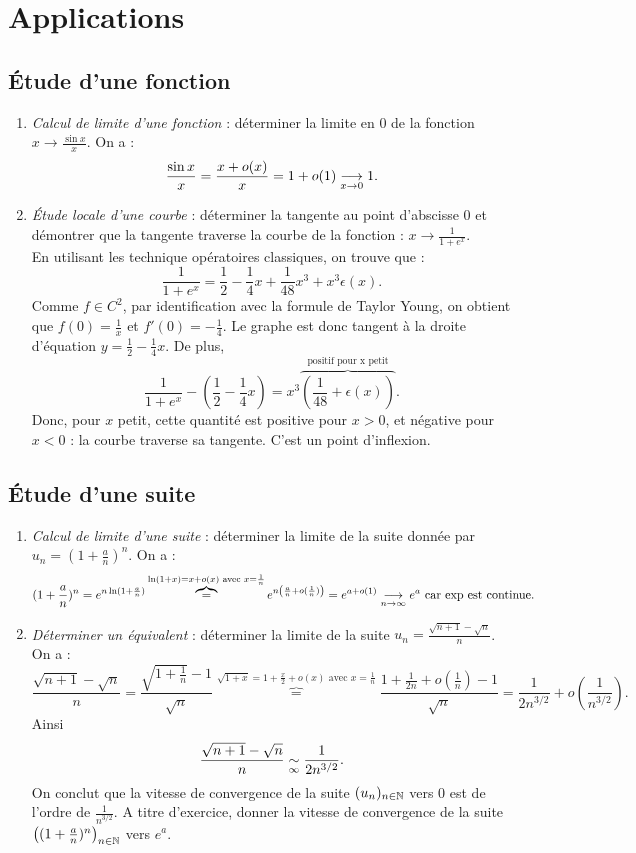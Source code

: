 \documentclass{book}
\begin{document}
\section{Applications}

\subsection{Étude d'une fonction}
\begin{enumerate}
\item \textit{Calcul de limite d'une fonction} : déterminer la limite en 0 de la fonction $x\to\frac{\sin x}{x}$. On a : 
$$\frac{\sin x}{x}= \frac{x+o(x)}{x}=1+o(1)\tend[x\to 0] 1.$$
\item \textit{Étude locale d'une courbe} : déterminer la tangente au point d'abscisse 0  et démontrer que la tangente traverse la courbe de la fonction : $x\to \frac{1}{1+e^x}$.\\
En utilisant les technique opératoires classiques, on trouve que :
$$\frac{1}{1+e^x}=\frac 1 2 - \frac 1 4 x + \frac{1}{48}x^3+x^3\epsilon(x).$$
Comme $f\in C^2$, par identification avec la formule de Taylor Young, on obtient que $f(0)=\frac 1 x$ et $f'(0)= - \frac 1 4$. Le graphe est donc tangent à la droite d'équation $y=\frac 1 2 - \frac 1 4 x.$
De plus, $$\frac{1}{1+e^x}- (\frac 1 2 - \frac 1 4 x)= x^3\overbrace{\left(\frac{1}{48}+\epsilon(x)\right)}^{\text{positif pour x petit}}.$$
Donc,  pour $x$ petit, cette quantité est positive pour $x>0$, et négative pour $x<0$ : la courbe traverse sa tangente. C'est un point d'inflexion.
\end{enumerate}


\subsection{Étude d'une suite}
\begin{enumerate}
\item \textit{Calcul de limite d'une suite} : déterminer la limite de la suite donnée par $u_n=(1+\frac a n )^n$. On a : 
$$(1+\frac a n )^n = e^{n\ln(1+\frac a n)}\overbrace{=}^{ \ln(1+x)=x+o(x)\text{ avec }x=\frac 1 n }e^{n\left(\frac a n + o(\frac 1 n)\right) }=e^{a+ o(1)}\tend[n\to\infty] e^a\text{ car exp est continue.}$$
\item \textit{Déterminer un équivalent} : déterminer la limite de la suite $u_n=\frac{\sqrt{n+1}-\sqrt{n}}{n}$. On a :
$$\frac{\sqrt{n+1}-\sqrt{n}}{n} = \frac{\sqrt{1+\frac 1 n}-1}{\sqrt{n}}\overbrace{=}^{ \sqrt{1+x}=1+\frac x 2 +o(x)\text{ avec }x=\frac 1 n}\frac{1+\frac{1}{2n}+o(\frac 1 n) -1}{\sqrt{n}}=\frac{1}{2n^{3/2}}+o\left(\frac{1}{n^{3/2}}\right).$$
Ainsi
$$\frac{\sqrt{n+1}-\sqrt{n}}{n} \equivalent[\infty] \frac{1}{2n^{3/2}}.$$
On conclut que la vitesse de convergence de la suite $(u_n)_{n\in\mathbb{N}}$ vers $0$ est de l'ordre de  $\frac{1}{n^{3/2}}$.  A titre d'exercice, donner la vitesse de convergence de la suite $\left((1+\frac a n )^n\right)_{n\in\mathbb{N}}$ vers $e^a$.
\end{enumerate}
\end{document}
